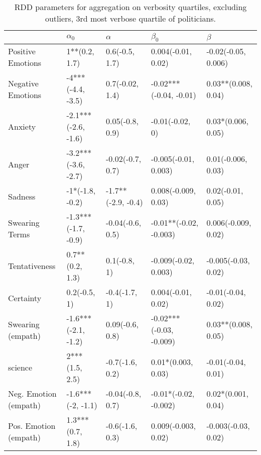 \begin{table}[h]\centering
\caption{RDD parameters for aggregation on verbosity quartiles, excluding outliers, 3rd most verbose quartile of politicians.}
	\label{fig: Verbosity_6}
\begin{adjustbox}{width=\linewidth, center}
	\begin{tabular}{lllll}
	\toprule
	{} &           $\alpha_0$ &            $\alpha$ &                $\beta_0$ &              $\beta$ \\
	\midrule
	Positive Emotions     &        1**(0.2, 1.7) &      0.6(-0.5, 1.7) &       0.004(-0.01, 0.02) &  -0.02(-0.05, 0.006) \\
	Negative Emotions     &    -4***(-4.4, -3.5) &     0.7(-0.02, 1.4) &   -0.02***(-0.04, -0.01) &  0.03**(0.008, 0.04) \\
	Anxiety               &  -2.1***(-2.6, -1.6) &     0.05(-0.8, 0.9) &          -0.01(-0.02, 0) &   0.03*(0.006, 0.05) \\
	Anger                 &  -3.2***(-3.6, -2.7) &    -0.02(-0.7, 0.7) &     -0.005(-0.01, 0.003) &   0.01(-0.006, 0.03) \\
	Sadness               &      -1*(-1.8, -0.2) &  -1.7**(-2.9, -0.4) &      0.008(-0.009, 0.03) &    0.02(-0.01, 0.05) \\
	Swearing Terms        &  -1.3***(-1.7, -0.9) &    -0.04(-0.6, 0.5) &   -0.01**(-0.02, -0.003) &  0.006(-0.009, 0.02) \\
	Tentativeness         &      0.7**(0.2, 1.3) &        0.1(-0.8, 1) &     -0.009(-0.02, 0.003) &  -0.005(-0.03, 0.02) \\
	Certainty             &         0.2(-0.5, 1) &       -0.4(-1.7, 1) &       0.004(-0.01, 0.02) &   -0.01(-0.04, 0.02) \\
	Swearing (empath)     &  -1.6***(-2.1, -1.2) &     0.09(-0.6, 0.8) &  -0.02***(-0.03, -0.009) &  0.03**(0.008, 0.05) \\
	science               &       2***(1.5, 2.5) &     -0.7(-1.6, 0.2) &       0.01*(0.003, 0.03) &   -0.01(-0.04, 0.01) \\
	Neg. Emotion (empath) &    -1.6***(-2, -1.1) &    -0.04(-0.8, 0.7) &    -0.01*(-0.02, -0.002) &   0.02*(0.001, 0.04) \\
	Pos. Emotion (empath) &     1.3***(0.7, 1.8) &     -0.6(-1.6, 0.3) &      0.009(-0.003, 0.02) &  -0.003(-0.03, 0.02) \\
	\bottomrule
	\end{tabular}
	
\end{adjustbox}
	\end{table}

